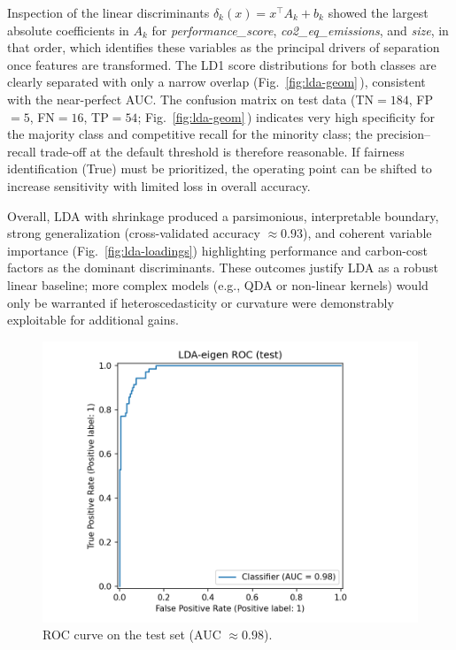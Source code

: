 \documentclass[journal]{IEEEtran}
\begin{document}
Inspection of the linear discriminants $\delta_k(x)=x^\top A_k+b_k$ showed the largest absolute coefficients in $A_k$ for \emph{performance\_score}, \emph{co2\_eq\_emissions}, and \emph{size}, in that order, which identifies these variables as the principal drivers of separation once features are transformed. The LD1 score distributions for both classes are clearly separated with only a narrow overlap (Fig.~\ref{fig:lda-geom}\,), consistent with the near-perfect AUC. The confusion matrix on test data (TN$=184$, FP$=5$, FN$=16$, TP$=54$; Fig.~\ref{fig:lda-geom}\,) indicates very high specificity for the majority class and competitive recall for the minority class; the precision--recall trade-off at the default threshold is therefore reasonable. If fairness identification (True) must be prioritized, the operating point can be shifted to increase sensitivity with limited loss in overall accuracy.

Overall, LDA with shrinkage produced a parsimonious, interpretable boundary, strong generalization (cross-validated accuracy $\approx0.93$), and coherent variable importance (Fig.~\ref{fig:lda-loadings}) highlighting performance and carbon-cost factors as the dominant discriminants. These outcomes justify LDA as a robust linear baseline; more complex models (e.g., QDA or non-linear kernels) would only be warranted if heteroscedasticity or curvature were demonstrably exploitable for additional gains.

\begin{figure}[t]
	\centering
	\includegraphics[width=.72\linewidth]{assets/LDA-eigen_roc_test.png}
	\caption{ROC curve on the test set (AUC $\approx 0.98$).}
	\label{fig:lda-roc}
\end{figure}
\end{document}
